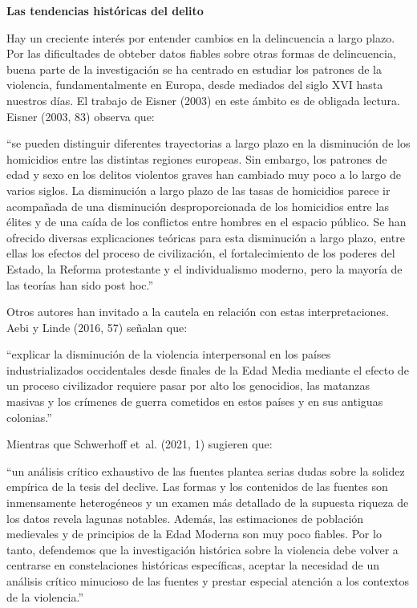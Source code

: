 \documentclass[
  spanish,
  letterpaper,
  DIV=11,
  numbers=noendperiod]{scrreprt}
\begin{document}
\begin{tcolorbox}[enhanced jigsaw, bottomtitle=1mm, toprule=.15mm, colbacktitle=quarto-callout-note-color!10!white, bottomrule=.15mm, leftrule=.75mm, colframe=quarto-callout-note-color-frame, opacitybacktitle=0.6, titlerule=0mm, breakable, colback=white, left=2mm, arc=.35mm, title=\textcolor{quarto-callout-note-color}{\faInfo}\hspace{0.5em}{Nota}, toptitle=1mm, coltitle=black, rightrule=.15mm, opacityback=0]

\textbf{Las tendencias históricas del delito}

Hay un creciente interés por entender cambios en la delincuencia a largo
plazo. Por las dificultades de obteber datos fiables sobre otras formas
de delincuencia, buena parte de la investigación se ha centrado en
estudiar los patrones de la violencia, fundamentalmente en Europa, desde
mediados del siglo XVI hasta nuestros días. El trabajo de Eisner (2003)
en este ámbito es de obligada lectura. Eisner (2003, 83) observa que:

``se pueden distinguir diferentes trayectorias a largo plazo en la
disminución de los homicidios entre las distintas regiones europeas. Sin
embargo, los patrones de edad y sexo en los delitos violentos graves han
cambiado muy poco a lo largo de varios siglos. La disminución a largo
plazo de las tasas de homicidios parece ir acompañada de una disminución
desproporcionada de los homicidios entre las élites y de una caída de
los conflictos entre hombres en el espacio público. Se han ofrecido
diversas explicaciones teóricas para esta disminución a largo plazo,
entre ellas los efectos del proceso de civilización, el fortalecimiento
de los poderes del Estado, la Reforma protestante y el individualismo
moderno, pero la mayoría de las teorías han sido post hoc.''

Otros autores han invitado a la cautela en relación con estas
interpretaciones. Aebi y Linde (2016, 57) señalan que:

``explicar la disminución de la violencia interpersonal en los países
industrializados occidentales desde finales de la Edad Media mediante el
efecto de un proceso civilizador requiere pasar por alto los genocidios,
las matanzas masivas y los crímenes de guerra cometidos en estos países
y en sus antiguas colonias.''

Mientras que Schwerhoff et~al. (2021, 1) sugieren que:

``un análisis crítico exhaustivo de las fuentes plantea serias dudas
sobre la solidez empírica de la tesis del declive. Las formas y los
contenidos de las fuentes son inmensamente heterogéneos y un examen más
detallado de la supuesta riqueza de los datos revela lagunas notables.
Además, las estimaciones de población medievales y de principios de la
Edad Moderna son muy poco fiables. Por lo tanto, defendemos que la
investigación histórica sobre la violencia debe volver a centrarse en
constelaciones históricas específicas, aceptar la necesidad de un
análisis crítico minucioso de las fuentes y prestar especial atención a
los contextos de la violencia.''

\end{tcolorbox}
\end{document}

